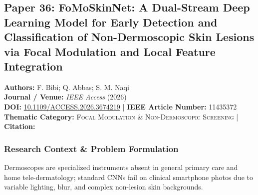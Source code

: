 \subsection{Paper 36: FoMoSkinNet: A Dual-Stream Deep Learning Model for Early Detection and Classification of Non-Dermoscopic Skin Lesions via Focal Modulation and Local Feature Integration}
\label{sec:paper_36}

\begin{tcolorbox}[colback=gray!5!white,colframe=gray!75!black,title=\textbf{Metadata \& Citation Summary}]
\textbf{Authors:} F. Bibi; Q. Abbas; S. M. Naqi \\
\textbf{Journal / Venue:} \textit{IEEE Access} (2026) \\
\textbf{DOI:} \href{https://doi.org/10.1109/ACCESS.2026.3674219}{10.1109/ACCESS.2026.3674219} \quad | \quad \textbf{IEEE Article Number:} 11435372 \\
\textbf{Thematic Category:} \textsc{Focal Modulation \& Non-Dermoscopic Screening} \quad | \quad \textbf{Citation:} \cite{11435372}
\end{tcolorbox}

\subsubsection*{Research Context \& Problem Formulation}
Dermoscopes are specialized instruments absent in general primary care and home tele-dermatology; standard CNNs fail on clinical smartphone photos due to variable lighting, blur, and complex non-lesion skin backgrounds.

